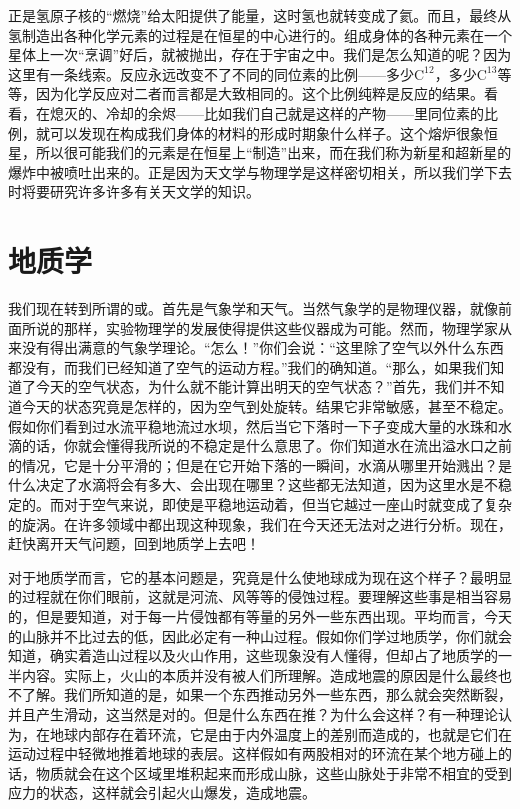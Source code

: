 正是氢原子核的“燃烧”给太阳提供了能量，这时氢也就转变成了氦。而且，最终从氢制造出各种化学元素的过程是在恒星的中心进行的。组成身体的各种元素在一个星体上一次“烹调”好后，就被抛出，存在于宇宙之中。我们是怎么知道的呢？因为这里有一条线索。反应永远改变不了不同的同位素的比例——多少$\mathrm{C}^{12}$，多少$\mathrm{C}^{13}$等等，因为化学反应对二者而言都是大致相同的。这个比例纯粹是反应的结果。看看，在熄灭的、冷却的余烬——比如我们自己就是这样的产物——里同位素的比例，就可以发现在构成我们身体的材料的形成时期象什么样子。这个熔炉很象恒星，所以很可能我们的元素是在恒星上“制造”出来，而在我们称为新星和超新星的爆炸中被喷吐出来的。正是因为天文学与物理学是这样密切相关，所以我们学下去时将要研究许多许多有关天文学的知识。



\section{地质学}

我们现在转到所谓的或。首先是气象学和天气。当然气象学的是物理仪器，就像前面所说的那样，实验物理学的发展使得提供这些仪器成为可能。然而，物理学家从来没有得出满意的气象学理论。“怎么！”你们会说：“这里除了空气以外什么东西都没有，而我们已经知道了空气的运动方程。”我们的确知道。“那么，如果我们知道了今天的空气状态，为什么就不能计算出明天的空气状态？”首先，我们并不知道今天的状态究竟是怎样的，因为空气到处旋转。结果它非常敏感，甚至不稳定。假如你们看到过水流平稳地流过水坝，然后当它下落时一下子变成大量的水珠和水滴的话，你就会懂得我所说的不稳定是什么意思了。你们知道水在流出溢水口之前的情况，它是十分平滑的；但是在它开始下落的一瞬间，水滴从哪里开始溅出？是什么决定了水滴将会有多大、会出现在哪里？这些都无法知道，因为这里水是不稳定的。而对于空气来说，即使是平稳地运动着，但当它越过一座山时就变成了复杂的旋涡。在许多领域中都出现这种现象，我们在今天还无法对之进行分析。现在，赶快离开天气问题，回到地质学上去吧！

对于地质学而言，它的基本问题是，究竟是什么使地球成为现在这个样子？最明显的过程就在你们眼前，这就是河流、风等等的侵蚀过程。要理解这些事是相当容易的，但是要知道，对于每一片侵蚀都有等量的另外一些东西出现。平均而言，今天的山脉并不比过去的低，因此必定有一种山过程。假如你们学过地质学，你们就会知道，确实着造山过程以及火山作用，这些现象没有人懂得，但却占了地质学的一半内容。实际上，火山的本质并没有被人们所理解。造成地震的原因是什么最终也不了解。我们所知道的是，如果一个东西推动另外一些东西，那么就会突然断裂，并且产生滑动，这当然是对的。但是什么东西在推？为什么会这样？有一种理论认为，在地球内部存在着环流，它是由于内外温度上的差别而造成的，也就是它们在运动过程中轻微地推着地球的表层。这样假如有两股相对的环流在某个地方碰上的话，物质就会在这个区域里堆积起来而形成山脉，这些山脉处于非常不相宜的受到应力的状态，这样就会引起火山爆发，造成地震。

